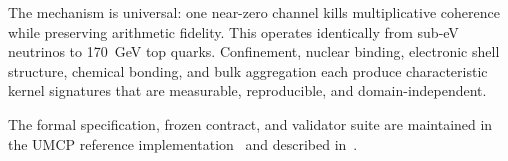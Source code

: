 \documentclass[
  aps,
  prd,
  twocolumn,
  superscriptaddress,
  nofootinbib,
  floatfix
]{revtex4-2}
\begin{document}
The mechanism is universal: one near-zero channel kills
multiplicative coherence while preserving arithmetic fidelity.
This operates identically from sub-eV neutrinos to
170~GeV top quarks.  Confinement, nuclear binding, electronic
shell structure, chemical bonding, and bulk aggregation each
produce characteristic kernel signatures that are measurable,
reproducible, and domain-independent.

\begin{acknowledgments}
The formal specification, frozen contract, and validator suite
are maintained in the UMCP reference
implementation~\cite{umcpmetadatarepo} and described
in~\cite{paulus2025umcp,paulus2025episteme}.
\end{acknowledgments}


\end{document}

